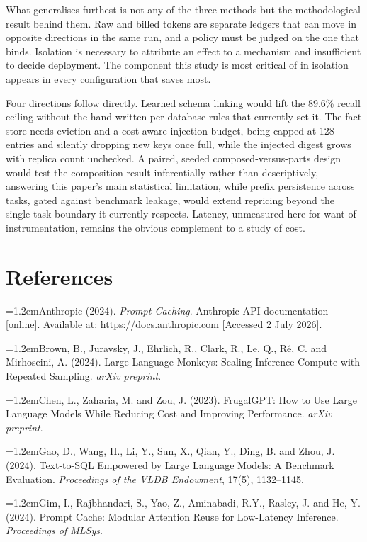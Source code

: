 \documentclass[conference]{IEEEtran}
\newcommand{\refentry}{\par\noindent\hangindent=1.2em\hangafter=1}
\begin{document}
What generalises furthest is not any of the three methods but the methodological
result behind them. Raw and
billed tokens are separate ledgers that can move in opposite directions in the
same run, and a policy must be judged on the one that binds. Isolation is
necessary to attribute an effect to a mechanism and insufficient to decide
deployment. The component this study is most critical of in isolation appears in
every configuration that saves most.

Four directions follow directly. Learned schema linking would lift the 89.6\%
recall ceiling without the hand-written per-database rules that currently set
it. The fact store needs eviction and a cost-aware injection budget, being
capped at 128 entries and silently dropping new keys once full, while the
injected digest grows with replica count unchecked. A paired, seeded
composed-versus-parts design would test the composition result inferentially
rather than descriptively, answering this paper's main statistical limitation,
while prefix persistence across tasks, gated against benchmark leakage, would
extend repricing beyond the single-task boundary it currently respects. Latency,
unmeasured here for want of instrumentation, remains the obvious complement to a
study of cost.

\section*{References}

\begingroup
\scriptsize
\setlength{\parindent}{0pt}

\refentry Anthropic (2024). \emph{Prompt Caching}. Anthropic API
documentation {[}online{]}. Available at: \url{https://docs.anthropic.com}
{[}Accessed 2 July 2026{]}.

\refentry Brown, B., Juravsky, J., Ehrlich, R., Clark, R., Le, Q., Ré, C. and
Mirhoseini, A. (2024). Large Language Monkeys: Scaling Inference Compute with
Repeated Sampling. \emph{arXiv preprint}.

\refentry Chen, L., Zaharia, M. and Zou, J. (2023). FrugalGPT: How to Use
Large Language Models While Reducing Cost and Improving Performance.
\emph{arXiv preprint}.

\refentry Gao, D., Wang, H., Li, Y., Sun, X., Qian, Y., Ding, B. and Zhou, J.
(2024). Text-to-SQL Empowered by Large Language Models: A Benchmark
Evaluation. \emph{Proceedings of the VLDB Endowment}, 17(5), 1132--1145.

\refentry Gim, I., Rajbhandari, S., Yao, Z., Aminabadi, R.Y., Rasley, J. and
He, Y. (2024). Prompt Cache: Modular Attention Reuse for Low-Latency
Inference. \emph{Proceedings of MLSys}.
\end{document}
